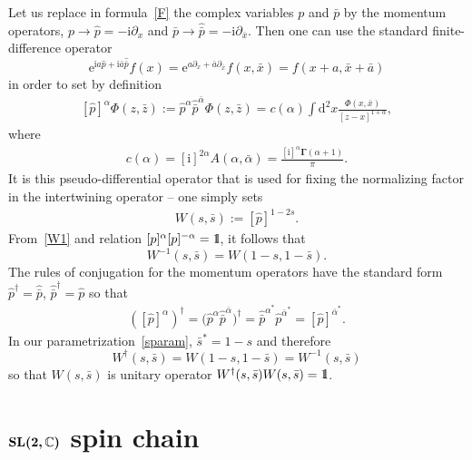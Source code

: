 \documentclass[10pt,a4paper]{amsart}
\renewcommand{\imath}{\mathrm{i}}
\newcommand{\II}{\hbox{{1}\kern-.25em\hbox{l}}}
\numberwithin{equation}{section}
\begin{document}
Let us replace in formula~\eqref{F} the complex variables $p$ and $\bar p$
by the momentum operators, $p \to \hat{p} = -\imath\partial_x$ and
$\bar{p} \to \hat{\bar{p}} = -\imath\partial_{\bar{x}}$.
Then one can use the standard finite-difference operator
\begin{equation*}
\mathrm{e}^{\imath a \hat{p}+\imath\bar{a} \hat{\bar{p}}}f(x) =
\mathrm{e}^{a\partial_x+\bar{a}\partial_{\bar{x}}}f(x,\bar{x})=
f(x+a,\bar{x}+\bar{a})
\end{equation*}
in order to set by definition
\begin{align} \label{d}
\left[\hat{p}\right]^{\alpha}\Phi(z,\bar z) :=
\hat{p}^{\alpha}\hat{\bar{p}}^{\bar{\alpha}}\Phi(z,\bar z) =
c(\alpha)
\int \mathrm{d}^2 x
\frac{\Phi(x,\bar x)}{[z-x]^{1+\alpha}},
\end{align}
where
\begin{align}\label{c}
c(\alpha) = [\imath]^{2\alpha} A(\alpha,\bar\alpha) = \frac{[\imath]^{\alpha} \bm{\Gamma}(\alpha+1)}{\pi}.
\end{align}
It is this pseudo-differential operator that is used for fixing the normalizing
factor in the intertwining operator -- one simply sets
\begin{align}
\label{W1}
W(s,\bar{s}) := [\hat{p}]^{1-2s}.
\end{align}
From~\eqref{W1} and relation $[p]^\alpha [p]^{-\alpha} = \II$, it follows that
\begin{equation*}
	W^{-1}(s,\bar{s}) = W(1-s,1-\bar{s}).
\end{equation*}
The rules of conjugation for the momentum
operators have the standard form $\hat{p}^{\dagger} = \hat{\bar{p}}$,
$\hat{\bar{p}}^{\dagger} = \hat{p}$ so that
\begin{align}\label{conj}
([\hat{p}]^{\alpha})^{\dagger} =
\bigl(\hat{p}^{\alpha}\hat{\bar{p}}^{\bar{\alpha}}\bigr)^{\dagger} =
\hat{\bar{p}}^{\alpha^*}\hat{p}^{\bar{\alpha}^*} =
[\hat{p}]^{\bar{\alpha}^*}.
\end{align}
In our parametrization~\eqref{sparam}, $\bar{s}^* = 1-s$ and therefore
\begin{equation*}
	W^{\dagger}(s,\bar{s}) = W(1-s,1-\bar{s}) = W^{-1}(s,\bar{s})
\end{equation*}
so that $W(s,\bar{s})$ is unitary operator
$W^{\dagger}(s,\bar{s}) W(s,\bar{s}) = \II$.

\section[SL(2,C) spin chain]{$\boldsymbol{{\rm SL}(2,\mathbb{C})}$ spin chain}
\label{RQ}
\end{document}
